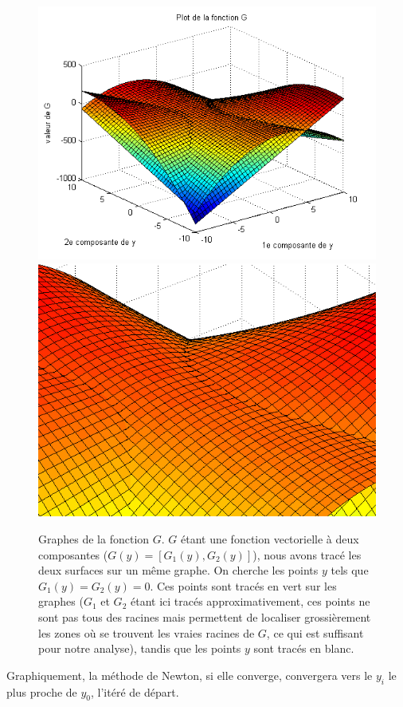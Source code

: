 \begin{figure}
\centering
\includegraphics[width=12cm]{grapheG.png}\\
\includegraphics[width=12cm]{grapheG2.png}
\caption{Graphes de la fonction $G$. $G$ étant une fonction vectorielle à deux composantes ($G(y)=[G_1(y), G_2(y)]$), nous avons tracé les deux surfaces sur un même graphe. On cherche les points $y$ tels que $G_1(y)=G_2(y)=0$. Ces points sont tracés en vert sur les graphes ($G_1$ et $G_2$ étant ici tracés approximativement, ces points ne sont pas tous des racines mais permettent de localiser grossièrement les zones où se trouvent les vraies racines de $G$, ce qui est suffisant pour notre analyse), tandis que les points $y$ sont tracés en blanc.}
\label{grapheG}
\end{figure}
Graphiquement, la méthode de Newton, si elle converge, convergera vers le $y_i$ le plus proche de $y_0$, l'itéré de départ.\\

